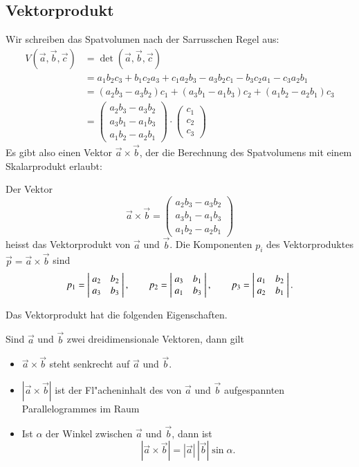 \subsection{Vektorprodukt}
Wir schreiben das Spatvolumen nach der Sarrusschen Regel aus:
\begin{align*}
V(\vec a,\vec b,\vec c)&=\det(\vec a,\vec b,\vec c)\\
&=
a_1b_2c_3+b_1c_2a_3+c_1a_2b_3
-a_3b_2c_1-b_3c_2a_1-c_3a_2b_1\\
&=
(a_2b_3-a_3b_2)c_1+(a_3b_1-a_1b_3)c_2+(a_1b_2-a_2b_1)c_3
\\
&=
\begin{pmatrix}
a_2b_3-a_3b_2\\
a_3b_1-a_1b_3\\
a_1b_2-a_2b_1
\end{pmatrix}
\cdot
\begin{pmatrix}
c_1\\c_2\\c_3
\end{pmatrix}
\end{align*}
Es gibt also einen Vektor $\vec a\times\vec b$, der die Berechnung
des Spatvolumens mit einem Skalarprodukt erlaubt:
\begin{definition}
Der Vektor
\[
\vec a\times\vec b= \begin{pmatrix}
a_2b_3-a_3b_2\\
a_3b_1-a_1b_3\\
a_1b_2-a_2b_1
\end{pmatrix}
\]
heisst das Vektorprodukt von $\vec a$ und $\vec b$. Die Komponenten $p_i$
des Vektorproduktes $\vec p=\vec a\times \vec b$ sind
\[
p_1
=
\left|\;\begin{matrix}
a_2&b_2\\a_3&b_3
\end{matrix}\;\right|\\
,\qquad p_2=
\left|\;\begin{matrix}
a_3&b_1\\a_1&b_3
\end{matrix}\;\right|\\
,\qquad p_3=
\left|\;\begin{matrix}
a_1&b_2\\a_2&b_1
\end{matrix}\;\right|.
\]
\end{definition}
Das Vektorprodukt hat die folgenden Eigenschaften.
\begin{satz}
Sind $\vec a$ und $\vec b$ zwei dreidimensionale Vektoren, dann gilt
\begin{itemize}
\item $\vec a\times\vec b$ steht senkrecht auf $\vec a$ und $\vec b$.
\item $|\vec a\times\vec b|$ ist der Fl"acheninhalt des von 
$\vec a$ und $\vec b$ aufgespannten Parallelogrammes im Raum
\item Ist $\alpha$ der Winkel zwischen $\vec a$ und $\vec b$, dann
ist
\[
|\vec a\times\vec b|=|\vec a|\,|\vec b|\sin \alpha.
\]
\end{itemize}
\end{satz}
